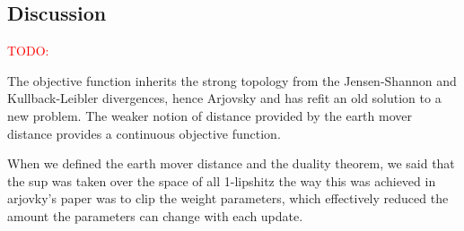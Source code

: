 \subsection{Discussion}
\textcolor{red}{TODO:}

The objective function inherits the strong topology from the
Jensen-Shannon and Kullback-Leibler divergences, hence Arjovsky and has
refit an old solution to a new problem. The weaker notion of distance
provided by the earth mover distance provides a continuous objective
function.

When we defined the earth mover distance and the duality theorem, we
said that the sup was taken over the space of all 1-lipshitz
the way this was achieved in arjovky's paper was to clip the weight
parameters, which effectively reduced the amount the parameters can
change with each update.

